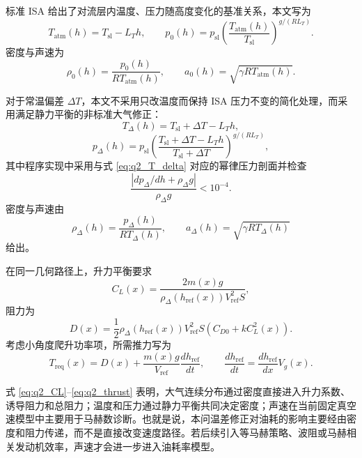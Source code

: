 \documentclass[withoutpreface,bwprint]{cumcmthesis}
\begin{document}
标准 ISA 给出了对流层内温度、压力随高度变化的基准关系\cite{icao_atmos}，本文写为
\begin{equation}
T_{\mathrm{atm}}(h)=T_{\mathrm{sl}}-L_T h,\qquad
p_0(h)=p_{\mathrm{sl}}\left(\frac{T_{\mathrm{atm}}(h)}{T_{\mathrm{sl}}}\right)^{g/(R L_T)}.
\end{equation}
密度与声速为
\begin{equation}
\rho_0(h)=\frac{p_0(h)}{R T_{\mathrm{atm}}(h)},\qquad
a_0(h)=\sqrt{\gamma R T_{\mathrm{atm}}(h)}.
\end{equation}

对于常温偏差 $\Delta T$，本文不采用只改温度而保持 ISA 压力不变的简化处理，而采用满足静力平衡的非标准大气修正：
\begin{equation}
T_\Delta(h)=T_{\mathrm{sl}}+\Delta T-L_T h,
\label{eq:q2_T_delta}
\end{equation}
\begin{equation}
p_\Delta(h)=p_{\mathrm{sl}}
\left(\frac{T_{\mathrm{sl}}+\Delta T-L_T h}{T_{\mathrm{sl}}+\Delta T}\right)^{g/(R L_T)},
\label{eq:q2_p_delta}
\end{equation}
其中程序实现中采用与式 \eqref{eq:q2_T_delta} 对应的幂律压力剖面并检查
\begin{equation}
\frac{|dp_\Delta/dh+\rho_\Delta g|}{\rho_\Delta g}<10^{-4}.
\end{equation}
密度与声速由
\begin{equation}
\rho_\Delta(h)=\frac{p_\Delta(h)}{R T_\Delta(h)},\qquad
a_\Delta(h)=\sqrt{\gamma R T_\Delta(h)}
\end{equation}
给出。

在同一几何路径上，升力平衡要求
\begin{equation}
C_L(x)=\frac{2m(x)g}{\rho_\Delta(h_{\mathrm{ref}}(x))V_{\mathrm{ref}}^2S},
\label{eq:q2_CL}
\end{equation}
阻力为
\begin{equation}
D(x)=\frac{1}{2}\rho_\Delta(h_{\mathrm{ref}}(x))V_{\mathrm{ref}}^2S
\left(C_{D0}+kC_L^2(x)\right).
\label{eq:q2_drag}
\end{equation}
考虑小角度爬升功率项，所需推力写为
\begin{equation}
T_{\mathrm{req}}(x)=D(x)+\frac{m(x)g}{V_{\mathrm{ref}}}\frac{dh_{\mathrm{ref}}}{dt},
\qquad
\frac{dh_{\mathrm{ref}}}{dt}=\frac{dh_{\mathrm{ref}}}{dx}V_g(x).
\label{eq:q2_thrust}
\end{equation}

式 \eqref{eq:q2_CL}--\eqref{eq:q2_thrust} 表明，大气连续分布通过密度直接进入升力系数、诱导阻力和总阻力；温度和压力通过静力平衡共同决定密度；声速在当前固定真空速模型中主要用于马赫数诊断。也就是说，本问温差修正对油耗的影响主要经由密度和阻力传递，而不是直接改变速度路径。若后续引入等马赫策略、波阻或马赫相关发动机效率，声速才会进一步进入油耗率模型。
\end{document}
